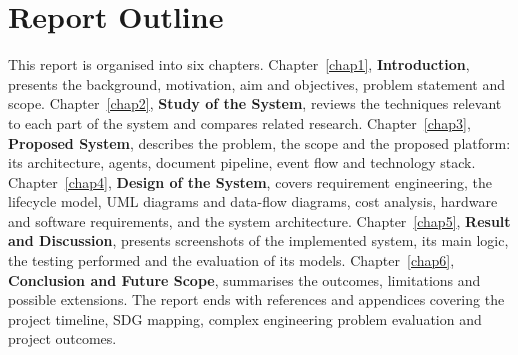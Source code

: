 \section{Report Outline}
This report is organised into six chapters. Chapter~\ref{chap1}, \textbf{Introduction}, presents the background, motivation, aim and objectives, problem statement and scope. Chapter~\ref{chap2}, \textbf{Study of the System}, reviews the techniques relevant to each part of the system and compares related research. Chapter~\ref{chap3}, \textbf{Proposed System}, describes the problem, the scope and the proposed platform: its architecture, agents, document pipeline, event flow and technology stack. Chapter~\ref{chap4}, \textbf{Design of the System}, covers requirement engineering, the lifecycle model, UML diagrams and data-flow diagrams, cost analysis, hardware and software requirements, and the system architecture. Chapter~\ref{chap5}, \textbf{Result and Discussion}, presents screenshots of the implemented system, its main logic, the testing performed and the evaluation of its models. Chapter~\ref{chap6}, \textbf{Conclusion and Future Scope}, summarises the outcomes, limitations and possible extensions. The report ends with references and appendices covering the project timeline, SDG mapping, complex engineering problem evaluation and project outcomes.
